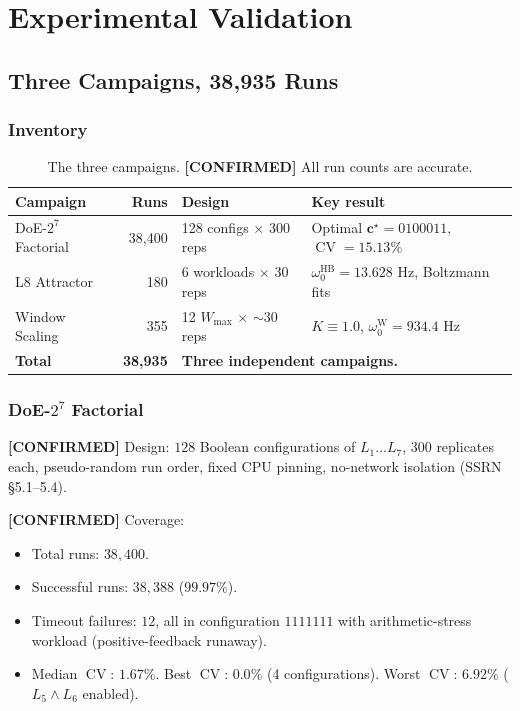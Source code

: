 \documentclass[11pt,letterpaper,openany]{book}
\theoremstyle{definition}
\theoremstyle{plain}
\newcommand{\confirmed}{\textcolor{green!50!black}{\textbf{[CONFIRMED]}}\xspace}
\newcommand{\Wmax}{W_{\mathrm{max}}}
\newcommand{\CV}{\operatorname{CV}}
\newcommand{\Loop}[1]{L_{#1}}
\begin{document}
\part{Experimental Validation}

\chapter{Three Campaigns, 38{,}935 Runs}
\label{ch:campaigns}

\section{Inventory}

\begin{table}[H]
  \centering\small
  \begin{tabular}{l r l l}
    \toprule
    Campaign            & Runs   & Design                          & Key result \\
    \midrule
    DoE-$2^7$ Factorial & 38{,}400 & 128 configs $\times$ 300 reps & Optimal $\mathbf{c}^\star = 0100011$, $\CV=15.13\%$ \\
    L8 Attractor        & 180     & 6 workloads $\times$ 30 reps   & $\omega_0^{\mathrm{HB}} = 13.628$ Hz, Boltzmann fits \\
    Window Scaling      & 355     & 12 $\Wmax$ $\times$ ${\sim}30$ reps & $K \equiv 1.0$, $\omega_0^{\mathrm{W}} = 934.4$ Hz \\
    \midrule
    \textbf{Total}      & \textbf{38{,}935} & \multicolumn{2}{l}{\textbf{Three independent campaigns.}} \\
    \bottomrule
  \end{tabular}
  \caption{The three campaigns. \confirmed All run counts are accurate.}
\end{table}

\section{DoE-$2^7$ Factorial}
\label{sec:doe27}

\confirmed Design: $128$ Boolean configurations of $\Loop{1}\dots\Loop{7}$,
$300$ replicates each, pseudo-random run order, fixed CPU pinning,
no-network isolation (SSRN \S5.1--5.4).

\confirmed Coverage:
\begin{itemize}\setlength\itemsep{0pt}
  \item Total runs: $38{,}400$.
  \item Successful runs: $38{,}388$ ($99.97\%$).
  \item Timeout failures: $12$, all in configuration $1111111$
    with arithmetic-stress workload (positive-feedback runaway).
  \item Median $\CV$: $1.67\%$. Best $\CV$: $0.0\%$ (4 configurations).
    Worst $\CV$: $6.92\%$ ($\Loop{5}\!\wedge\!\Loop{6}$ enabled).
\end{itemize}
\end{document}
